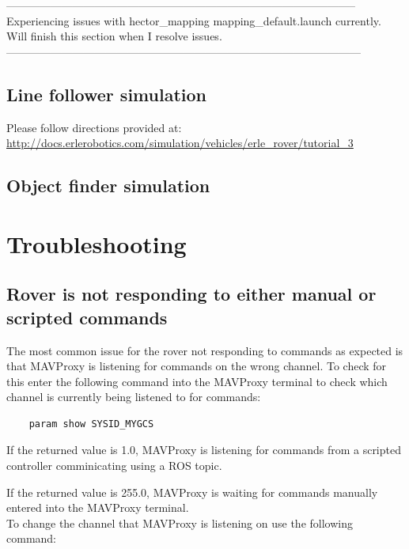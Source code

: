 \documentclass{report}
\begin{document}
-----------------------------------------------------------------------------------------------\\
Experiencing issues with hector\_mapping mapping\_default.launch currently. Will finish this section when I resolve issues.\\
------------------------------------------------------------------------------------------------\\



\section{Line follower simulation}
Please follow directions provided at:
\href{http://docs.erlerobotics.com/simulation/vehicles/erle_rover/tutorial_3}{http://docs.erlerobotics.com/simulation/vehicles/erle\_rover/tutorial\_3}


\section{Object finder simulation}








\chapter{Troubleshooting}
\section{Rover is not responding to either manual or scripted commands}\label{changeMAVcommandSource}
The most common issue for the rover not responding to commands as expected is that MAVProxy is listening for commands on the wrong channel. To check for this enter the following command into the MAVProxy terminal to check which channel is currently being listened to for commands:
\begin{lstlisting}
	param show SYSID_MYGCS
\end{lstlisting}

If the returned value is 1.0, MAVProxy is listening for commands from a scripted controller comminicating using a ROS topic.

If the returned value is 255.0, MAVProxy is waiting for commands manually entered into the MAVProxy terminal. \\

To change the channel that MAVProxy is listening on use the following command:
\end{document}
